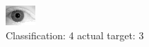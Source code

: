 \begin{figure}[h!]
\begin{center}
\includegraphics[width=0.60\columnwidth]{figures/ID2219_class_4_target_3.png}
\end{center}
\caption{ Classification: 4 actual target: 3}
\label{fig:ID2219_class_4_target_3}
\end{figure}
